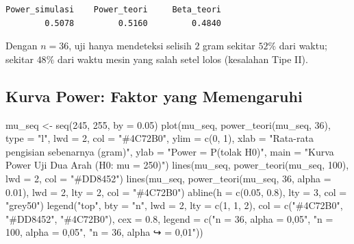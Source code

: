 \documentclass[
  indonesian,
  letterpaper,
]{book}
\newenvironment{Shaded}{\begin{snugshade}}{\end{snugshade}}
\newcommand{\AttributeTok}[1]{\textcolor[rgb]{0.40,0.45,0.13}{#1}}
\newcommand{\DecValTok}[1]{\textcolor[rgb]{0.68,0.00,0.00}{#1}}
\newcommand{\FloatTok}[1]{\textcolor[rgb]{0.68,0.00,0.00}{#1}}
\newcommand{\FunctionTok}[1]{\textcolor[rgb]{0.28,0.35,0.67}{#1}}
\newcommand{\NormalTok}[1]{\textcolor[rgb]{0.00,0.23,0.31}{#1}}
\newcommand{\OtherTok}[1]{\textcolor[rgb]{0.00,0.23,0.31}{#1}}
\newcommand{\StringTok}[1]{\textcolor[rgb]{0.13,0.47,0.30}{#1}}
\begin{document}
\begin{verbatim}
Power_simulasi    Power_teori     Beta_teori 
        0.5078         0.5160         0.4840 
\end{verbatim}

Dengan \(n = 36\), uji hanya mendeteksi selisih \(2\) gram sekitar
\(52\%\) dari waktu; sekitar \(48\%\) dari waktu mesin yang salah setel
lolos (kesalahan Tipe II).

\subsection{Kurva Power: Faktor yang
Memengaruhi}\label{kurva-power-faktor-yang-memengaruhi}

\begin{Shaded}
\begin{Highlighting}[]
\NormalTok{mu\_seq }\OtherTok{\textless{}{-}} \FunctionTok{seq}\NormalTok{(}\DecValTok{245}\NormalTok{, }\DecValTok{255}\NormalTok{, }\AttributeTok{by =} \FloatTok{0.05}\NormalTok{)}
\FunctionTok{plot}\NormalTok{(mu\_seq, }\FunctionTok{power\_teori}\NormalTok{(mu\_seq, }\DecValTok{36}\NormalTok{), }\AttributeTok{type =} \StringTok{"l"}\NormalTok{, }\AttributeTok{lwd =} \DecValTok{2}\NormalTok{, }\AttributeTok{col =} \StringTok{"\#4C72B0"}\NormalTok{, }\AttributeTok{ylim =}
\FunctionTok{c}\NormalTok{(}\DecValTok{0}\NormalTok{, }\DecValTok{1}\NormalTok{),}
\AttributeTok{xlab =} \StringTok{"Rata{-}rata pengisian sebenarnya (gram)"}\NormalTok{, }\AttributeTok{ylab =} \StringTok{"Power = P(tolak H0)"}\NormalTok{,}
\AttributeTok{main =} \StringTok{"Kurva Power Uji Dua Arah (H0: mu = 250)"}\NormalTok{)}
\FunctionTok{lines}\NormalTok{(mu\_seq, }\FunctionTok{power\_teori}\NormalTok{(mu\_seq, }\DecValTok{100}\NormalTok{), }\AttributeTok{lwd =} \DecValTok{2}\NormalTok{, }\AttributeTok{col =} \StringTok{"\#DD8452"}\NormalTok{)}
\FunctionTok{lines}\NormalTok{(mu\_seq, }\FunctionTok{power\_teori}\NormalTok{(mu\_seq, }\DecValTok{36}\NormalTok{, }\AttributeTok{alpha =} \FloatTok{0.01}\NormalTok{), }\AttributeTok{lwd =} \DecValTok{2}\NormalTok{, }\AttributeTok{lty =} \DecValTok{2}\NormalTok{, }\AttributeTok{col =}
\StringTok{"\#4C72B0"}\NormalTok{)}
\FunctionTok{abline}\NormalTok{(}\AttributeTok{h =} \FunctionTok{c}\NormalTok{(}\FloatTok{0.05}\NormalTok{, }\FloatTok{0.8}\NormalTok{), }\AttributeTok{lty =} \DecValTok{3}\NormalTok{, }\AttributeTok{col =} \StringTok{"grey50"}\NormalTok{)}
\FunctionTok{legend}\NormalTok{(}\StringTok{"top"}\NormalTok{, }\AttributeTok{bty =} \StringTok{"n"}\NormalTok{, }\AttributeTok{lwd =} \DecValTok{2}\NormalTok{, }\AttributeTok{lty =} \FunctionTok{c}\NormalTok{(}\DecValTok{1}\NormalTok{, }\DecValTok{1}\NormalTok{, }\DecValTok{2}\NormalTok{), }\AttributeTok{col =} \FunctionTok{c}\NormalTok{(}\StringTok{"\#4C72B0"}\NormalTok{, }\StringTok{"\#DD8452"}\NormalTok{,}
\StringTok{"\#4C72B0"}\NormalTok{), }\AttributeTok{cex =} \FloatTok{0.8}\NormalTok{,}
\AttributeTok{legend =} \FunctionTok{c}\NormalTok{(}\StringTok{"n = 36, alpha = 0,05"}\NormalTok{, }\StringTok{"n = 100, alpha = 0,05"}\NormalTok{, }\StringTok{"n = 36, alpha}
\StringTok{↪ = 0,01"}\NormalTok{))}
\end{Highlighting}
\end{Shaded}
\end{document}
